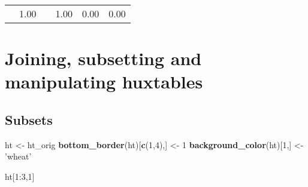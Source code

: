 \documentclass[]{article}
\newenvironment{Shaded}{\begin{snugshade}}{\end{snugshade}}
\newcommand{\KeywordTok}[1]{\textcolor[rgb]{0.13,0.29,0.53}{\textbf{{#1}}}}
\newcommand{\DecValTok}[1]{\textcolor[rgb]{0.00,0.00,0.81}{{#1}}}
\newcommand{\StringTok}[1]{\textcolor[rgb]{0.31,0.60,0.02}{{#1}}}
\newcommand{\NormalTok}[1]{{#1}}
\begin{document}
\begin{table}[h]
\begin{centering}
\begin{tabularx}{0.5\textwidth}{p{} p{} p{} p{} p{} p{}}
\multicolumn{1}{l}{\rule{0pt}{\baselineskip+4pt}\hspace*{4pt}    \hspace*{4pt}\rule[-4pt]{0pt}{4pt}} & \multicolumn{1}{l}{\rule{0pt}{\baselineskip+4pt}\hspace*{4pt} 1.00\hspace*{4pt}\rule[-4pt]{0pt}{4pt}} & \multicolumn{1}{l}{\rule{0pt}{\baselineskip+4pt}\hspace*{4pt}   \hspace*{4pt}\rule[-4pt]{0pt}{4pt}} & \multicolumn{1}{l}{\rule{0pt}{\baselineskip+4pt}\hspace*{4pt} 1.00\hspace*{4pt}\rule[-4pt]{0pt}{4pt}} & \multicolumn{1}{l}{\rule{0pt}{\baselineskip+4pt}\hspace*{4pt} 0.00\hspace*{4pt}\rule[-4pt]{0pt}{4pt}} & \multicolumn{1}{l}{\rule{0pt}{\baselineskip+4pt}\hspace*{4pt} 0.00\hspace*{4pt}\rule[-4pt]{0pt}{4pt}} \tabularnewline[-0.5pt]
\end{tabularx}
\par\end{centering}
\end{table}

\FloatBarrier

\section{Joining, subsetting and manipulating
huxtables}\label{joining-subsetting-and-manipulating-huxtables}

\subsection{Subsets}\label{subsets}

\begin{Shaded}
\begin{Highlighting}[]
\NormalTok{ht <-}\StringTok{ }\NormalTok{ht_orig}
\KeywordTok{bottom_border}\NormalTok{(ht)[}\KeywordTok{c}\NormalTok{(}\DecValTok{1}\NormalTok{,}\DecValTok{4}\NormalTok{),] <-}\StringTok{ }\DecValTok{1}
\KeywordTok{background_color}\NormalTok{(ht)[}\DecValTok{1}\NormalTok{,] <-}\StringTok{ 'wheat'}

\NormalTok{ht[}\DecValTok{1}\NormalTok{:}\DecValTok{3}\NormalTok{,}\DecValTok{1}\NormalTok{]}
\end{Highlighting}
\end{Shaded}
\end{document}
